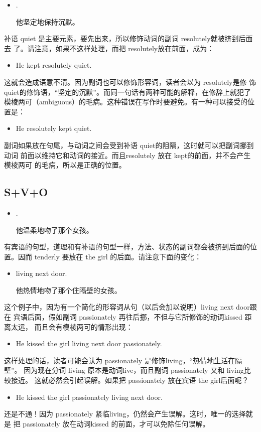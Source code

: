 \begin{itemize}
\item {}   .

  他坚定地保持沉默。
\end{itemize}
补语 quiet 是主要元素，要先出来，所以修饰动词的副词 resolutely就被挤到后面去
了。请注意，如果不这样处理，而把 resolutely放在前面，成为：

\begin{itemize}
\item He kept resolutely quiet.
\end{itemize}
这就会造成语意不清。因为副词也可以修饰形容词，读者会以为 resolutely是修
饰 quiet的修饰语，“坚定的沉默”。而同一句话有两种可能的解释，在修辞上就犯了
模棱两可（ambiguous）的毛病。这种错误在写作时要避免。有一种可以接受的位置是：
\begin{itemize}
\item  He resolutely kept quiet.
\end{itemize}
副词如果放在句尾，与动词之间会受到补语 quiet的阻隔，这时就可以把副词挪到动词
前面以维持它和动词的接近。而且resolutely 放在 kept的前面，并不会产生模棱两可
的毛病，所以是正确的位置。

\subsection{S+V+O}

\begin{itemize}
\item  {}   .

  他温柔地吻了那个女孩。
\end{itemize}
有宾语的句型，道理和有补语的句型一样，方法、状态的副词都会被挤到后面的位置。因而
tenderly 要放在 the girl 的后面。请注意下面的变化：
\begin{itemize}
\item  {}    living next door.

  他热情地吻了那个住隔壁的女孩。
\end{itemize}
这个例子中，因为有一个简化的形容词从句（以后会加以说明）living next door跟在
宾语后面，假如副词 passionately 再往后挪，不但与它所修饰的动词kissed 距离太远，
而且会有模棱两可的情形出现：
\begin{itemize}
\item  He kissed the girl living next door passionately.
\end{itemize}
这样处理的话，读者可能会认为 passionately 是修饰living，“热情地生活在隔壁”。
因为现在分词 living 原本是动词live，而且副词 passionately 又和 living比较接近。
这就必然会引起误解。如果把 passionately 放在宾语 the girl后面呢？
\begin{itemize}
\item  He kissed the girl passionately living next door.
\end{itemize}
还是不通！因为 passionately 紧临living，仍然会产生误解。这时，唯一的选择就是
把 passionately 放在动词kissed 的前面，才可以免除任何误解。

